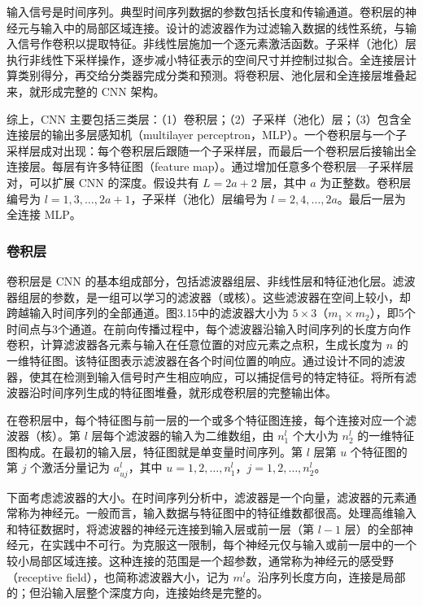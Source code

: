 输入信号是时间序列。典型时间序列数据的参数包括长度和传输通道。卷积层的神经元与输入中的局部区域连接。设计的滤波器作为过滤输入数据的线性系统，与输入信号作卷积以提取特征。非线性层施加一个逐元素激活函数。子采样（池化）层执行非线性下采样操作，逐步减小特征表示的空间尺寸并控制过拟合。全连接层计算类别得分，再交给分类器完成分类和预测。将卷积层、池化层和全连接层堆叠起来，就形成完整的 CNN 架构。

综上，CNN 主要包括三类层：（1）卷积层；（2）子采样（池化）层；（3）包含全连接层的输出多层感知机（multilayer perceptron，MLP）。一个卷积层与一个子采样层成对出现：每个卷积层后跟随一个子采样层，而最后一个卷积层后接输出全连接层。每层有许多特征图（feature map）。通过增加任意多个卷积层—子采样层对，可以扩展 CNN 的深度。假设共有 $L=2a+2$ 层，其中 $a$ 为正整数。卷积层编号为 $l=1,3,\ldots,2a+1$，子采样（池化）层编号为 $l=2,4,\ldots,2a$。最后一层为全连接 MLP。


\FloatBarrier

\subsubsection{卷积层}

卷积层是 CNN 的基本组成部分，包括滤波器组层、非线性层和特征池化层。滤波器组层的参数，是一组可以学习的滤波器（或核）。这些滤波器在空间上较小，却跨越输入时间序列的全部通道。图3.15中的滤波器大小为 $5\times3$（$m_1\times m_2$），即5个时间点与3个通道。在前向传播过程中，每个滤波器沿输入时间序列的长度方向作卷积，计算滤波器各元素与输入在任意位置的对应元素之点积，生成长度为 $n$ 的一维特征图。该特征图表示滤波器在各个时间位置的响应。通过设计不同的滤波器，使其在检测到输入信号时产生相应响应，可以捕捉信号的特定特征。将所有滤波器沿时间序列生成的特征图堆叠，就形成卷积层的完整输出体。




在卷积层中，每个特征图与前一层的一个或多个特征图连接，每个连接对应一个滤波器（核）。第 $l$ 层每个滤波器的输入为二维数组，由 $n_1^l$ 个大小为 $n_2^l$ 的一维特征图构成。在最初的输入层，特征图就是单变量时间序列。第 $l$ 层第 $u$ 个特征图的第 $j$ 个激活分量记为 $a_{uj}^l$，其中 $u=1,2,\ldots,n_1^l$，$j=1,2,\ldots,n_2^l$。

下面考虑滤波器的大小。在时间序列分析中，滤波器是一个向量，滤波器的元素通常称为神经元。一般而言，输入数据与特征图中的特征维数都很高。处理高维输入和特征数据时，将滤波器的神经元连接到输入层或前一层（第 $l-1$ 层）的全部神经元，在实践中不可行。为克服这一限制，每个神经元仅与输入或前一层中的一个较小局部区域连接。这种连接的范围是一个超参数，通常称为神经元的感受野（receptive field），也简称滤波器大小，记为 $m^l$。沿序列长度方向，连接是局部的；但沿输入层整个深度方向，连接始终是完整的。

